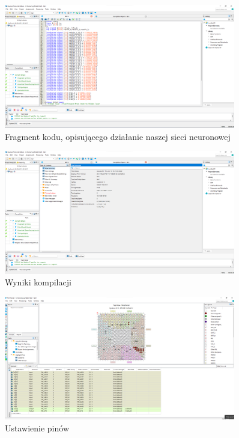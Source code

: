 \documentclass[a4paper, titleauthor]{mwart}
\begin{document}
\begin{figure}[h!]
    \centering
    \includegraphics[width = 0.9\textwidth]{code.png}
    \caption{Fragment kodu, opisującego działanie naszej sieci neuronowej}
    \label{fig:enter-label}
\end{figure}
\begin{figure}[h!]
    \centering
    \includegraphics[width = 0.9\textwidth]{compilation.png}
    \caption{Wyniki kompilacji}
    \label{fig:enter-label}
\end{figure}
\newpage
\begin{figure}[h!]
    \centering
    \includegraphics[width = 0.9\textwidth]{pins.png}
    \caption{Ustawienie pinów}
    \label{fig:enter-label}
\end{figure}
\end{document}
